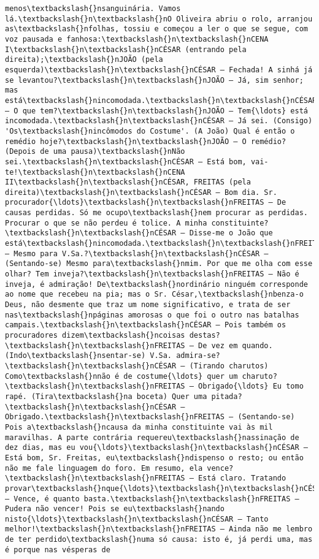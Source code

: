 \documentclass[11pt]{article}
\begin{document}
\begin{Verbatim}[commandchars=\\\{\}]
menos\textbackslash{}nsanguinária. Vamos lá.\textbackslash{}n\textbackslash{}nO Oliveira abriu o rolo, arranjou as\textbackslash{}nfolhas, tossiu e começou a ler o que se segue, com voz pausada e fanhosa:\textbackslash{}n\textbackslash{}nCENA I\textbackslash{}n\textbackslash{}nCÉSAR (entrando pela direita);\textbackslash{}nJOÃO (pela esquerda)\textbackslash{}n\textbackslash{}nCÉSAR — Fechada! A sinhá já se levantou?\textbackslash{}n\textbackslash{}nJOÃO — Já, sim senhor; mas está\textbackslash{}nincomodada.\textbackslash{}n\textbackslash{}nCÉSAR — O que tem?\textbackslash{}n\textbackslash{}nJOÃO — Tem{\ldots} está incomodada.\textbackslash{}n\textbackslash{}nCÉSAR — Já sei. (Consigo) 'Os\textbackslash{}nincômodos do Costume'. (A João) Qual é então o remédio hoje?\textbackslash{}n\textbackslash{}nJOÃO — O remédio? (Depois de uma pausa)\textbackslash{}nNão sei.\textbackslash{}n\textbackslash{}nCÉSAR — Está bom, vai-te!\textbackslash{}n\textbackslash{}nCENA II\textbackslash{}n\textbackslash{}nCÉSAR, FREITAS (pela direita)\textbackslash{}n\textbackslash{}nCÉSAR — Bom dia. Sr. procurador{\ldots}\textbackslash{}n\textbackslash{}nFREITAS — De causas perdidas. Só me ocupo\textbackslash{}nem procurar as perdidas. Procurar o que se não perdeu é tolice. A minha constituinte?\textbackslash{}n\textbackslash{}nCÉSAR — Disse-me o João que está\textbackslash{}nincomodada.\textbackslash{}n\textbackslash{}nFREITAS — Mesmo para V.Sa.?\textbackslash{}n\textbackslash{}nCÉSAR — (Sentando-se) Mesmo para\textbackslash{}nmim. Por que me olha com esse olhar? Tem inveja?\textbackslash{}n\textbackslash{}nFREITAS — Não é inveja, é admiração! De\textbackslash{}nordinário ninguém corresponde ao nome que recebeu na pia; mas o Sr. César,\textbackslash{}nbenza-o Deus, não desmente que traz um nome significativo, e trata de ser nas\textbackslash{}npáginas amorosas o que foi o outro nas batalhas campais.\textbackslash{}n\textbackslash{}nCÉSAR — Pois também os procuradores dizem\textbackslash{}ncoisas destas?\textbackslash{}n\textbackslash{}nFREITAS — De vez em quando. (Indo\textbackslash{}nsentar-se) V.Sa. admira-se?\textbackslash{}n\textbackslash{}nCÉSAR — (Tirando charutos) Como\textbackslash{}nnão é de costume{\ldots} quer um charuto?\textbackslash{}n\textbackslash{}nFREITAS — Obrigado{\ldots} Eu tomo rapé. (Tira\textbackslash{}na boceta) Quer uma pitada?\textbackslash{}n\textbackslash{}nCÉSAR — Obrigado.\textbackslash{}n\textbackslash{}nFREITAS — (Sentando-se) Pois a\textbackslash{}ncausa da minha constituinte vai às mil maravilhas. A parte contrária requereu\textbackslash{}nassinação de dez dias, mas eu vou{\ldots}\textbackslash{}n\textbackslash{}nCÉSAR — Está bom, Sr. Freitas, eu\textbackslash{}ndispenso o resto; ou então não me fale linguagem do foro. Em resumo, ela vence?\textbackslash{}n\textbackslash{}nFREITAS — Está claro. Tratando provar\textbackslash{}nque{\ldots}\textbackslash{}n\textbackslash{}nCÉSAR — Vence, é quanto basta.\textbackslash{}n\textbackslash{}nFREITAS — Pudera não vencer! Pois se eu\textbackslash{}nando nisto{\ldots}\textbackslash{}n\textbackslash{}nCÉSAR — Tanto melhor!\textbackslash{}n\textbackslash{}nFREITAS — Ainda não me lembro de ter perdido\textbackslash{}numa só causa: isto é, já perdi uma, mas é porque nas vésperas de 
\end{Verbatim}
\end{document}
